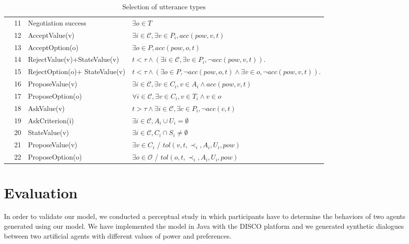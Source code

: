 \documentclass{llncs}
\begin{document}
\begin{table}[!t]
{\begin{tabular}{|p{.3cm}|p{.6cm}|p{3cm}|p{7.5cm}|}
					\parbox[t]{2mm}{
						} & 11& Negotiation success &  $\exists o \in T$ \\
					&12& AcceptValue(v) & $\exists i\in\mathcal{C}, \exists v \in P_i, acc(pow, v, t)$ \\
					&13&AcceptOption(o) & $\exists o \in P, acc(pow, o, t)$ \\
					&14&RejectValue(v)+\newline StateValue(v) & $ t<\tau \land (\exists i\in\mathcal{C}, \exists v \in P_i, \neg acc(pow,v, t))$.\\
					&15&RejectOption(o)+ \newline StateValue(v) & $ t<\tau \land (\exists o \in P,  \neg acc(pow,o, t) \land \exists v \in o, \neg acc(pow,v, t))$.\\
					&16&ProposeValue(v) &  $\exists i\in\mathcal{C}, \exists v \in C_i, v \in A_i  \land acc(pow, v, t) $\\
					&17&ProposeOption(o)  & $\forall i\in\mathcal{C},\exists v \in C_i, v \in T_i  \land v \in o$ \\
					&18&AskValue(v) & $t > \tau \land \exists i\in\mathcal{C}, \exists c \in P_i, \neg acc(c, t)$ \\
					&19&AskCriterion(i) & $\exists i\in\mathcal{C}, A_i \cup U_i= \emptyset $\\
					&20&StateValue(v) & $\exists i\in\mathcal{C}, C_i\cap S_i \neq \emptyset$	\\
					&21& ProposeValue(v) & $\exists v \in C_i$ / $tol(v, t, \prec_i, A_i, U_i, pow)$\\
					&22& ProposeOption(o) & $\exists o \in \mathcal{O}$ / $tol(o, t, \prec_i, A_i, U_i, pow)$\\
					
					\hline
				\end{tabular}
			}
			\caption{Selection of utterance types}
			\label{utt}
		\end{table}
		
		\section{Evaluation}
		\label{sec:evaluation}
		
		In order to validate our model, we conducted a perceptual study in which participants have to determine the behaviors of two agents generated using our model. We have implemented the model in Java with the DISCO platform \cite{rich09} and we generated synthetic dialogues between two artificial agents with different values of power and preferences.
		
\end{document}
